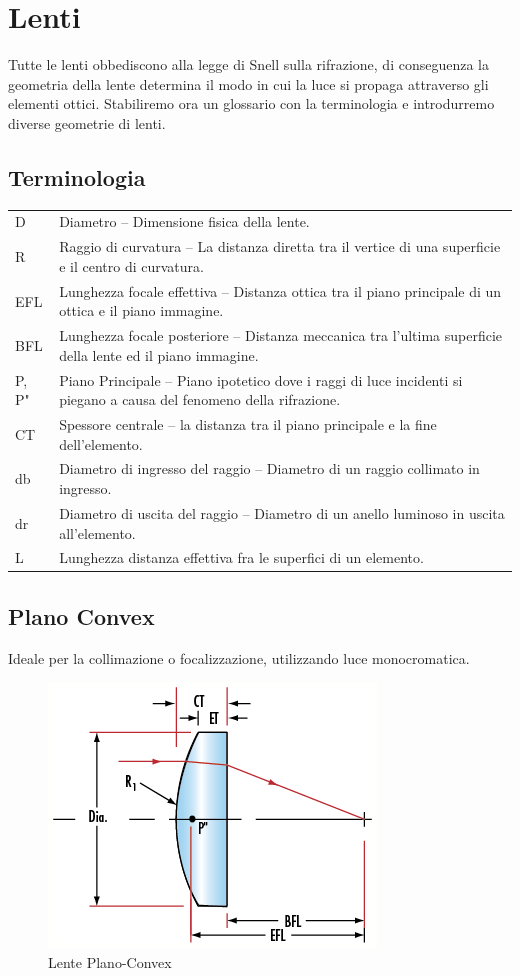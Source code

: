 \section{Lenti}
Tutte le lenti obbediscono alla legge di Snell sulla rifrazione, di conseguenza la geometria della lente determina il modo in cui la luce si propaga attraverso gli elementi ottici. Stabiliremo ora un glossario con la terminologia e introdurremo diverse geometrie di lenti.

\subsection{Terminologia}

\begin{tabularx}{\textwidth}{l p{}}

D               & 	Diametro – Dimensione fisica della lente.\\
R               &	Raggio di curvatura – La distanza diretta tra il vertice di una superficie e il centro di curvatura.\\
EFL 	        &   Lunghezza focale effettiva – Distanza ottica tra il piano principale di un ottica e il piano immagine.\\
BFL 	        &   Lunghezza focale posteriore – Distanza meccanica tra l'ultima superficie della lente ed il piano immagine.\\
P, P" 	        &   Piano Principale – Piano ipotetico dove i raggi di luce incidenti si piegano a causa del fenomeno della rifrazione.\\
CT              & 	Spessore centrale – la distanza tra il piano principale e la fine dell'elemento.\\
db 	            &   Diametro di ingresso del raggio – Diametro di un raggio collimato in ingresso.\\
dr 	            &    Diametro di uscita del raggio – Diametro di un anello luminoso in uscita all'elemento.\\
L 	            &   Lunghezza distanza effettiva fra le superfici di un elemento.
\end{tabularx}

\subsection{Plano Convex}
Ideale per la collimazione o focalizzazione, utilizzando luce monocromatica.
\begin{figure}[!ht]
\centering

\includegraphics[width=.3\textwidth]{img/plano-convex.png}

\caption{Lente Plano-Convex}
\label{fig:ccd-blockdiagram}
\end{figure}


